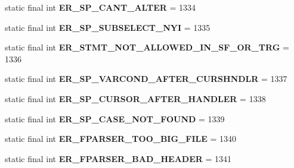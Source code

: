 \begin{DoxyCompactItemize}
static final int {\bfseries E\+R\+\_\+\+S\+P\+\_\+\+C\+A\+N\+T\+\_\+\+A\+L\+T\+ER} = 1334
\item 
\mbox{\label{classcom_1_1mysql_1_1jdbc_1_1_mysql_error_numbers_a2f25256cda4131326bb45bf496744da9}} 
static final int {\bfseries E\+R\+\_\+\+S\+P\+\_\+\+S\+U\+B\+S\+E\+L\+E\+C\+T\+\_\+\+N\+YI} = 1335
\item 
\mbox{\label{classcom_1_1mysql_1_1jdbc_1_1_mysql_error_numbers_a32a9a5d42d8319458c103ec8f5223965}} 
static final int {\bfseries E\+R\+\_\+\+S\+T\+M\+T\+\_\+\+N\+O\+T\+\_\+\+A\+L\+L\+O\+W\+E\+D\+\_\+\+I\+N\+\_\+\+S\+F\+\_\+\+O\+R\+\_\+\+T\+RG} = 1336
\item 
\mbox{\label{classcom_1_1mysql_1_1jdbc_1_1_mysql_error_numbers_ac46be0388f7a4fdbe04784dfe4e676ac}} 
static final int {\bfseries E\+R\+\_\+\+S\+P\+\_\+\+V\+A\+R\+C\+O\+N\+D\+\_\+\+A\+F\+T\+E\+R\+\_\+\+C\+U\+R\+S\+H\+N\+D\+LR} = 1337
\item 
\mbox{\label{classcom_1_1mysql_1_1jdbc_1_1_mysql_error_numbers_a3455ded9538f4802886df219e5658c82}} 
static final int {\bfseries E\+R\+\_\+\+S\+P\+\_\+\+C\+U\+R\+S\+O\+R\+\_\+\+A\+F\+T\+E\+R\+\_\+\+H\+A\+N\+D\+L\+ER} = 1338
\item 
\mbox{\label{classcom_1_1mysql_1_1jdbc_1_1_mysql_error_numbers_aa2e68785d8c0cd13dc9831979705d0d9}} 
static final int {\bfseries E\+R\+\_\+\+S\+P\+\_\+\+C\+A\+S\+E\+\_\+\+N\+O\+T\+\_\+\+F\+O\+U\+ND} = 1339
\item 
\mbox{\label{classcom_1_1mysql_1_1jdbc_1_1_mysql_error_numbers_a043111291e58d3a02084480879f4b6a8}} 
static final int {\bfseries E\+R\+\_\+\+F\+P\+A\+R\+S\+E\+R\+\_\+\+T\+O\+O\+\_\+\+B\+I\+G\+\_\+\+F\+I\+LE} = 1340
\item 
\mbox{\label{classcom_1_1mysql_1_1jdbc_1_1_mysql_error_numbers_a8048cac36c8690806f5deb715eb675c2}} 
static final int {\bfseries E\+R\+\_\+\+F\+P\+A\+R\+S\+E\+R\+\_\+\+B\+A\+D\+\_\+\+H\+E\+A\+D\+ER} = 1341

\end{DoxyCompactItemize}

